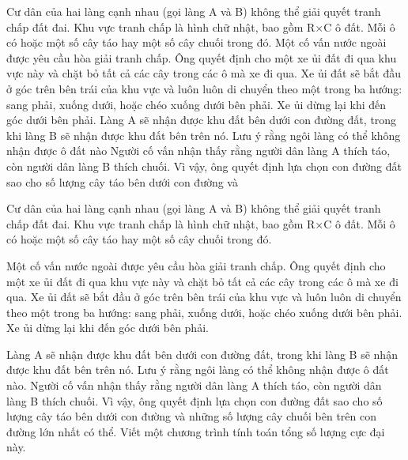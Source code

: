 Cư dân của hai làng cạnh nhau (gọi làng A và B) không thể giải quyết tranh chấp đất đai. Khu       vực tranh chấp là hình chữ nhật, bao gồm R×C ô đất. Mỗi ô có hoặc một số cây táo hay một số       cây chuối trong đó.       Một cố vấn nước ngoài được yêu cầu hòa giải tranh chấp. Ông quyết định cho một xe ủi đất đi       qua khu vực này và chặt bỏ tất cả các cây trong các ô mà xe đi qua. Xe ủi đất sẽ bắt đầu ở góc       trên bên trái của khu vực và luôn luôn di chuyển theo một trong ba hướng: sang phải, xuống       dưới, hoặc chéo xuống dưới bên phải. Xe ủi dừng lại khi đến góc dưới bên phải.       Làng A sẽ nhận được khu đất bên dưới con đường đất, trong khi làng B sẽ nhận được khu đất       bên trên nó. Lưu ý rằng ngôi làng có thể không nhận được ô đất nào       Người cố vấn nhận thấy rằng người dân làng A thích táo, còn người dân làng B thích chuối. Vì       vậy, ông quyết định lựa chọn con đường đất sao cho số lượng cây táo bên dưới con đường và    

   Cư dân của hai làng cạnh nhau (gọi làng A và B) không thể giải quyết tranh chấp đất đai. Khu vực tranh chấp là hình chữ nhật, bao gồm R×C ô đất. Mỗi ô có hoặc một số cây táo hay một số cây chuối trong đó.  

   Một cố vấn nước ngoài được yêu cầu hòa giải tranh chấp. Ông quyết định cho một xe ủi đất đi qua khu vực này và chặt bỏ tất cả các cây trong các ô mà xe đi qua. Xe ủi đất sẽ bắt đầu ở góc trên bên trái của khu vực và luôn luôn di chuyển theo một trong ba hướng: sang phải, xuống dưới, hoặc chéo xuống dưới bên phải. Xe ủi dừng lại khi đến góc dưới bên phải.  

   Làng A sẽ nhận được khu đất bên dưới con đường đất, trong khi làng B sẽ nhận được khu đất bên trên nó. Lưu ý rằng ngôi làng có thể không nhận được ô đất nào. Người cố vấn nhận thấy rằng người dân làng A thích táo, còn người dân làng B thích chuối. Vì vậy, ông quyết định lựa chọn con đường đất sao cho số lượng cây táo bên dưới con đường và những số lượng cây chuối bên trên con đường lớn nhất có thể. Viết một chương trình tính toán tổng số lượng cực đại này.  



\